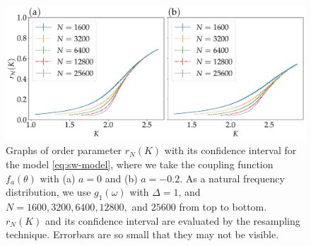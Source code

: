 \begin{figure}[t]
  \begin{center}
    \includegraphics[width=\textwidth]{figs/small_world_orderparam.pdf}
  \end{center}
  \caption{
    Graphs of order parameter $r_{N}(K)$ with its confidence interval for the model \eqref{eq:sw-model},
    where we take the coupling function $f_{a}(\theta)$
    with (a) $a=0$ and (b) $a=-0.2$.
    As a natural frequency distribution,
    we use $g_{1}(\omega)$ with $\Delta=1$,
    and $N=1600, 3200, 6400, 12800,$ and $25600$ from top to bottom.
    $r_{N}(K)$ and its confidence interval are evaluated by the resampling technique.
    Errorbars are so small that they may not be visible.
  }
  \label{fig:bif-fss}
\end{figure}



